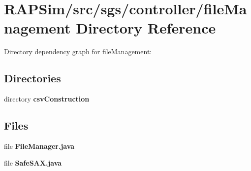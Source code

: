 \section{R\-A\-P\-Sim/src/sgs/controller/file\-Management Directory Reference}
\label{dir_127aa4ac8168d7e14a48395997148833}
Directory dependency graph for file\-Management\-:
\subsection*{Directories}
\begin{DoxyCompactItemize}
\item 
directory {\bf csv\-Construction}
\end{DoxyCompactItemize}
\subsection*{Files}
\begin{DoxyCompactItemize}
\item 
file {\bf File\-Manager.\-java}
\item 
file {\bf Safe\-S\-A\-X.\-java}
\end{DoxyCompactItemize}
